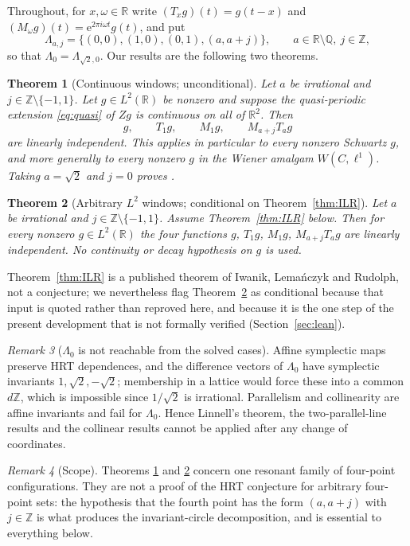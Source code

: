 \documentclass[11pt]{amsart}
\newtheorem{theorem}{Theorem}
\theoremstyle{remark}
\newtheorem{remark}[theorem]{Remark}
\newcommand{\Q}{\mathbb Q}
\newcommand{\R}{\mathbb R}
\newcommand{\Z}{\mathbb Z}
\newcommand{\e}{\mathrm e}
\begin{document}
Throughout, for $x,\omega\in\R$ write $(T_xg)(t)=g(t-x)$ and
$(M_\omega g)(t)=\e^{2\pi i\omega t}g(t)$, and put
\[
\Lambda_{a,j}=\{(0,0),(1,0),(0,1),(a,a+j)\},\qquad a\in\R\setminus\Q,\ j\in\Z ,
\]
so that $\Lambda_0=\Lambda_{\sqrt2,0}$. Our results are the following two theorems.

\begin{theorem}[Continuous windows; unconditional]\label{thm:cont}
Let $a$ be irrational and $j\in\Z\setminus\{-1,1\}$. Let $g\in L^2(\R)$ be nonzero and suppose
the quasi-periodic extension \eqref{eq:quasi} of $Zg$ is continuous on all of $\R^2$. Then
\[
g,\qquad T_1g,\qquad M_1g,\qquad M_{a+j}T_ag
\]
are linearly independent. This applies in particular to every nonzero Schwartz $g$, and more
generally to every nonzero $g$ in the Wiener amalgam $W(C,\ell^1)$. Taking $a=\sqrt2$ and
$j=0$ proves \cite[Conjecture~2]{HS}.
\end{theorem}

\begin{theorem}[Arbitrary $L^2$ windows; conditional on Theorem~\ref{thm:ILR}]\label{thm:L2}
Let $a$ be irrational and $j\in\Z\setminus\{-1,1\}$. Assume Theorem~\ref{thm:ILR} below. Then
for \emph{every} nonzero $g\in L^2(\R)$ the four functions $g$, $T_1g$, $M_1g$, $M_{a+j}T_ag$
are linearly independent. No continuity or decay hypothesis on $g$ is used.
\end{theorem}

Theorem~\ref{thm:ILR} is a published theorem of Iwanik, Lema\'nczyk and Rudolph, not a
conjecture; we nevertheless flag Theorem~\ref{thm:L2} as conditional because that input is
quoted rather than reproved here, and because it is the one step of the present development
that is not formally verified (Section~\ref{sec:lean}).

\begin{remark}[$\Lambda_0$ is not reachable from the solved cases]\label{rem:symp}
Affine symplectic maps preserve HRT dependences, and the difference vectors of $\Lambda_0$
have symplectic invariants $1,\sqrt2,-\sqrt2$; membership in a lattice would force these into
a common $d\Z$, which is impossible since $1/\sqrt2$ is irrational. Parallelism and
collinearity are affine invariants and fail for $\Lambda_0$. Hence Linnell's theorem, the
two-parallel-line results and the collinear results cannot be applied after any change of
coordinates.
\end{remark}

\begin{remark}[Scope]\label{rem:scope}
Theorems \ref{thm:cont} and \ref{thm:L2} concern one resonant family of four-point
configurations. They are not a proof of the HRT conjecture for arbitrary four-point sets: the
hypothesis that the fourth point has the form $(a,a+j)$ with $j\in\Z$ is what produces the
invariant-circle decomposition, and is essential to everything below.
\end{remark}
\end{document}
